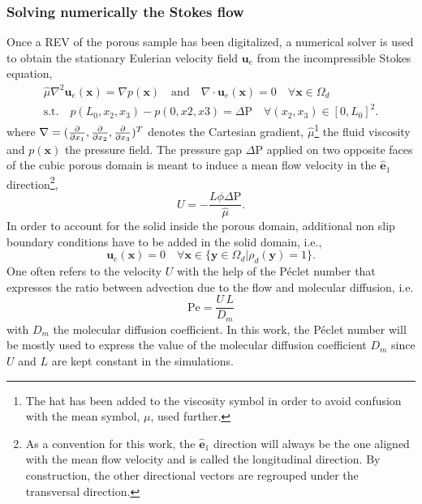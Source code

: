 \subsubsection{Solving numerically the Stokes flow}
Once a REV of the porous sample has been digitalized, a numerical solver is used to obtain the stationary Eulerian velocity field $\textbf{u}_e$ from the incompressible Stokes equation,
\begin{equation}\label{eq:stokes}
\begin{array}{c}
	\hat{\mu}\nabla^2\textbf{u}_e(\textbf{x}) = \nabla p(\textbf{x}) \quad\textrm{and}\quad \nabla\cdot\textbf{u}_e(\textbf{x})=0\quad \forall \textbf{x}\in\Omega_d\\
	\textrm{s.t.}\quad p(L_0,x_2,x_3) - p(0,x2,x3) = \Delta\textrm{P} \quad \forall (x_2,x_3)\in[0,L_0]^2.
\end{array}
\end{equation}
where $\nabla = (\pdv{x_1},\pdv{x_2},\pdv{x_3})^T$ denotes the Cartesian gradient, $\hat{\mu}$\footnote{The hat has been added to the viscosity symbol in order to avoid confusion with the mean symbol, $\mu$, used further.} the fluid viscosity and $p(\textbf{x})$ the pressure field.
The pressure gap $\Delta\textrm{P}$ applied on two opposite faces of the cubic porous domain is meant to induce a mean flow velocity in the $\hat{\textbf{e}}_1$ direction\footnote{As a convention for this work, the $\hat{\textbf{e}}_1$ direction will always be the one aligned with the mean flow velocity and is called the longitudinal direction. By construction, the other directional vectors are regrouped under the transversal direction.}, 
\[
U=-\frac{L \phi \Delta\textrm{P}}{\hat\mu}.
\]
In order to account for the solid inside the porous domain, additional non slip boundary conditions have to be added in the solid domain, i.e.,
\begin{equation}\label{eq:nonslip_sideBC}
\textbf{u}_e(\textbf{x})=0 \quad\forall \textbf{x} \in \{\textbf{y}\in\Omega_d|\rho_d(\textbf{y})=1\}.
\end{equation}
One often refers to the velocity $U$ with the help of the Péclet number that expresses the ratio between advection due to the flow and molecular diffusion, i.e.
\begin{equation}\label{eq:peclet}
\textrm{Pe}=\frac{U\,L}{D_m}
\end{equation}
with $D_m$ the molecular diffusion coefficient. 
In this work, the Péclet number will be mostly used to express the value of the molecular diffusion coefficient $D_m$ since $U$ and $L$ are kept constant in the simulations.
